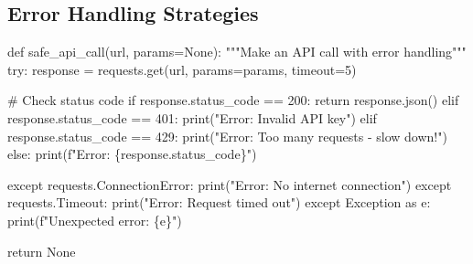 \documentclass[
  letterpaper,
  DIV=11,
  numbers=noendperiod,
  oneside]{scrreprt}
\newenvironment{Shaded}{}{}
\newcommand{\BuiltInTok}[1]{\textcolor[rgb]{0.84,0.23,0.29}{#1}}
\newcommand{\CommentTok}[1]{\textcolor[rgb]{0.42,0.45,0.49}{#1}}
\newcommand{\ControlFlowTok}[1]{\textcolor[rgb]{0.84,0.23,0.29}{#1}}
\newcommand{\DecValTok}[1]{\textcolor[rgb]{0.00,0.36,0.77}{#1}}
\newcommand{\ImportTok}[1]{\textcolor[rgb]{0.01,0.18,0.38}{#1}}
\newcommand{\KeywordTok}[1]{\textcolor[rgb]{0.84,0.23,0.29}{#1}}
\newcommand{\NormalTok}[1]{\textcolor[rgb]{0.14,0.16,0.18}{#1}}
\newcommand{\OperatorTok}[1]{\textcolor[rgb]{0.14,0.16,0.18}{#1}}
\newcommand{\PreprocessorTok}[1]{\textcolor[rgb]{0.84,0.23,0.29}{#1}}
\newcommand{\SpecialCharTok}[1]{\textcolor[rgb]{0.00,0.36,0.77}{#1}}
\newcommand{\SpecialStringTok}[1]{\textcolor[rgb]{0.01,0.18,0.38}{#1}}
\newcommand{\StringTok}[1]{\textcolor[rgb]{0.01,0.18,0.38}{#1}}
\newcommand{\VariableTok}[1]{\textcolor[rgb]{0.89,0.38,0.04}{#1}}
\begin{document}
\subsection{Error Handling Strategies}\label{error-handling-strategies}

\begin{Shaded}
\begin{Highlighting}[]
\KeywordTok{def}\NormalTok{ safe\_api\_call(url, params}\OperatorTok{=}\VariableTok{None}\NormalTok{):}
    \CommentTok{"""Make an API call with error handling"""}
    \ControlFlowTok{try}\NormalTok{:}
\NormalTok{        response }\OperatorTok{=}\NormalTok{ requests.get(url, params}\OperatorTok{=}\NormalTok{params, timeout}\OperatorTok{=}\DecValTok{5}\NormalTok{)}
        
        \CommentTok{\# Check status code}
        \ControlFlowTok{if}\NormalTok{ response.status\_code }\OperatorTok{==} \DecValTok{200}\NormalTok{:}
            \ControlFlowTok{return}\NormalTok{ response.json()}
        \ControlFlowTok{elif}\NormalTok{ response.status\_code }\OperatorTok{==} \DecValTok{401}\NormalTok{:}
            \BuiltInTok{print}\NormalTok{(}\StringTok{"Error: Invalid API key"}\NormalTok{)}
        \ControlFlowTok{elif}\NormalTok{ response.status\_code }\OperatorTok{==} \DecValTok{429}\NormalTok{:}
            \BuiltInTok{print}\NormalTok{(}\StringTok{"Error: Too many requests {-} slow down!"}\NormalTok{)}
        \ControlFlowTok{else}\NormalTok{:}
            \BuiltInTok{print}\NormalTok{(}\SpecialStringTok{f"Error: }\SpecialCharTok{\{}\NormalTok{response}\SpecialCharTok{.}\NormalTok{status\_code}\SpecialCharTok{\}}\SpecialStringTok{"}\NormalTok{)}
            
    \ControlFlowTok{except}\NormalTok{ requests.}\PreprocessorTok{ConnectionError}\NormalTok{:}
        \BuiltInTok{print}\NormalTok{(}\StringTok{"Error: No internet connection"}\NormalTok{)}
    \ControlFlowTok{except}\NormalTok{ requests.Timeout:}
        \BuiltInTok{print}\NormalTok{(}\StringTok{"Error: Request timed out"}\NormalTok{)}
    \ControlFlowTok{except} \PreprocessorTok{Exception} \ImportTok{as}\NormalTok{ e:}
        \BuiltInTok{print}\NormalTok{(}\SpecialStringTok{f"Unexpected error: }\SpecialCharTok{\{}\NormalTok{e}\SpecialCharTok{\}}\SpecialStringTok{"}\NormalTok{)}
    
    \ControlFlowTok{return} \VariableTok{None}
\end{Highlighting}
\end{Shaded}
\end{document}
